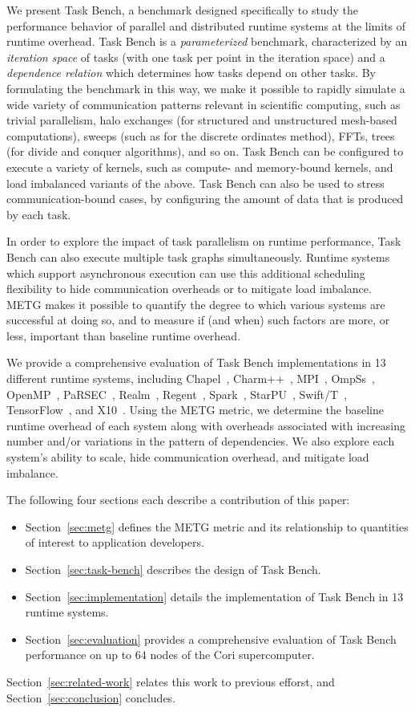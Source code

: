 We present Task Bench, a benchmark designed specifically to study the
performance behavior of parallel and distributed runtime systems at
the limits of runtime overhead. Task Bench is a \emph{parameterized}
benchmark, characterized by an \emph{iteration space} of tasks (with
one task per point in the iteration space) and a \emph{dependence
  relation} which determines how tasks depend on other tasks. By
formulating the benchmark in this way, we make it possible to rapidly
simulate a wide variety of communication patterns relevant in
scientific computing, such as trivial parallelism, halo exchanges (for
structured and unstructured mesh-based computations), sweeps (such as
for the discrete ordinates method), FFTs, trees (for divide and
conquer algorithms), and so on. Task Bench can be configured to
execute a variety of kernels, such as compute- and memory-bound
kernels, and load imbalanced variants of the above. Task Bench can
also be used to stress communication-bound cases, by configuring the
amount of data that is produced by each task.

In order to explore the impact of task parallelism on runtime
performance, Task Bench can also execute multiple task graphs
simultaneously. Runtime systems which support asynchronous execution
can use this additional scheduling flexibility to hide communication
overheads or to mitigate load imbalance. METG makes it possible to
quantify the degree to which various systems are successful at doing
so, and to measure if (and when) such factors are more, or less,
important than baseline runtime overhead.

We provide a comprehensive evaluation of Task Bench implementations in
13 different runtime systems, including Chapel~\cite{Chapel07},
Charm++~\cite{Charmpp93}, MPI~\cite{MPI}, OmpSs~\cite{OmpSs11},
OpenMP~\cite{OpenMPSpec40}, PaRSEC~\cite{PARSEC13},
Realm~\cite{Realm14}, Regent~\cite{Regent15}, Spark~\cite{Spark10},
StarPU~\cite{StarPU11}, Swift/T~\cite{Wozniak13},
TensorFlow~\cite{TensorFlow15}, and X10~\cite{X1005}. Using the METG
metric, we determine the baseline runtime overhead of each system
along with overheads associated with increasing number and/or
variations in the pattern of dependencies. We also explore each
system's ability to scale, hide communication overhead, and mitigate
load imbalance.

The following four sections each describe a contribution of this
paper:

\begin{itemize}
\item Section~\ref{sec:metg} defines the METG metric and its
  relationship to quantities of interest to application developers.
\item Section~\ref{sec:task-bench} describes the design of Task Bench.
\item Section~\ref{sec:implementation} details the implementation of
  Task Bench in 13 runtime systems.
\item Section~\ref{sec:evaluation} provides a comprehensive evaluation
  of Task Bench performance on up to 64 nodes of the Cori
  supercomputer.
\end{itemize}

Section~\ref{sec:related-work} relates this work to previous efforst,
and Section~\ref{sec:conclusion} concludes.
